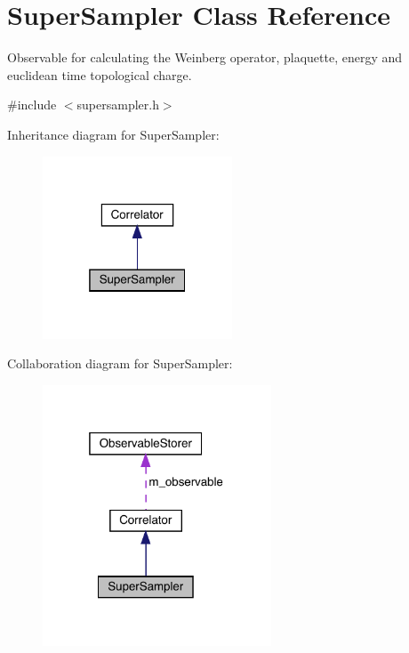 \hypertarget{class_super_sampler}{}\section{Super\+Sampler Class Reference}
\label{class_super_sampler}


Observable for calculating the Weinberg operator, plaquette, energy and euclidean time topological charge.  




{\ttfamily \#include $<$supersampler.\+h$>$}



Inheritance diagram for Super\+Sampler\+:
\nopagebreak
\begin{figure}[H]
\begin{center}
\leavevmode
\includegraphics[width=160pt]{class_super_sampler__inherit__graph}
\end{center}
\end{figure}


Collaboration diagram for Super\+Sampler\+:
\nopagebreak
\begin{figure}[H]
\begin{center}
\leavevmode
\includegraphics[width=193pt]{class_super_sampler__coll__graph}
\end{center}
\end{figure}
